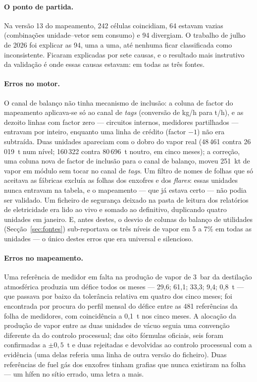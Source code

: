 \paragraph{O ponto de partida.} Na versão 13 do mapeamento, 242 células
coincidiam, 64 estavam vazias (combinações unidade--vetor sem consumo) e
94 divergiam. O trabalho de julho de 2026 foi explicar as 94, uma a uma,
até nenhuma ficar classificada como inconsistente. Ficaram explicadas por
sete causas, e o resultado mais instrutivo da validação é onde essas
causas estavam: em todas as três fontes.

\paragraph{Erros no motor.} O canal de balanço não tinha mecanismo de
inclusão: a coluna de factor do mapeamento aplicava-se só ao canal de
\emph{tags} (conversão de kg/h para t/h), e as dezoito linhas com factor
zero --- circuitos internos, medidores partilhados --- entravam por
inteiro, enquanto uma linha de crédito (factor $-1$) não era subtraída.
Duas unidades apareciam com o dobro do vapor real (48\,461 contra
26\,019~t num nível; 160\,322 contra 80\,696~t noutro, em cinco meses); a
correção, uma coluna nova de factor de inclusão para o canal de balanço,
moveu 251~kt de vapor em módulo sem tocar no canal de \emph{tags}. Um
filtro de nomes de folhas que só aceitava as fábricas excluía as folhas
dos enxofres e dos \emph{flares}: essas unidades nunca entravam na tabela,
e o mapeamento --- que já estava certo --- não podia ser validado. Um
ficheiro de segurança deixado na pasta de leitura dos relatórios de
eletricidade era lido ao vivo e somado ao definitivo, duplicando quatro
unidades em janeiro. E, antes destes, o desvio de colunas do balanço de
utilidades (Secção~\ref{sec:fontes}) sub-reportava os três níveis de vapor
em 5 a 7\% em todas as unidades --- o único destes erros que era
universal e silencioso.

\paragraph{Erros no mapeamento.} Uma referência de medidor em falta na
produção de vapor de 3~bar da destilação atmosférica produzia um défice
todos os meses --- 29,6; 61,1; 33,3; 9,4; 0,8~t --- que passava por baixo
da tolerância relativa em quatro dos cinco meses; foi encontrada por
procura do perfil mensal do défice entre as 481 referências da folha de
medidores, com coincidência a 0,1~t nos cinco meses. A alocação da
produção de vapor entre as duas unidades de vácuo seguia uma convenção
diferente da do controlo processual; das oito fórmulas oficiais, seis
foram confirmadas a $\pm0{,}5$~t e duas rejeitadas e devolvidas ao
controlo processual com a evidência (uma delas referia uma linha de
outra versão do ficheiro). Duas referências de fuel gás dos enxofres
tinham grafias que nunca existiram na folha --- um hífen no sítio errado,
uma letra a mais.

